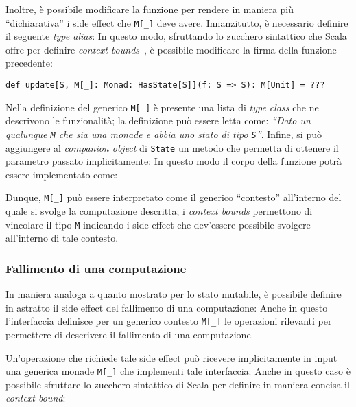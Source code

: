 Inoltre, è possibile modificare la funzione per rendere in maniera più ``dichiarativa'' i side effect che \lstinline{M[_]} deve avere. Innanzitutto, è necessario definire il seguente \emph{type alias}:
In questo modo, sfruttando lo zucchero sintattico che Scala offre per definire \emph{context bounds}~\cite{cit:context-bounds}, è possibile modificare la firma della funzione precedente:
\begin{lstlisting}[language=scala3]
def update[S, M[_]: Monad: HasState[S]](f: S => S): M[Unit] = ???
\end{lstlisting}
Nella definizione del generico \lstinline{M[_]} è presente una lista di \emph{type class} che ne descrivono le funzionalità; la definizione può essere letta come: \emph{``Dato un qualunque \lstinline{M} che sia una monade e abbia uno stato di tipo \lstinline{S}''}.
Infine, si può aggiungere al \emph{companion object} di \lstinline{State} un metodo che permetta di ottenere il parametro passato implicitamente:
In questo modo il corpo della funzione potrà essere implementato come:

Dunque, \lstinline{M[_]} può essere interpretato come il generico ``contesto'' all'interno del quale si svolge la computazione descritta; i \emph{context bounds} permettono di vincolare il tipo \lstinline{M} indicando i side effect che dev'essere possibile svolgere all'interno di tale contesto.

\subsubsection{Fallimento di una computazione}
In maniera analoga a quanto mostrato per lo stato mutabile, è possibile definire in astratto il side effect del fallimento di una computazione:
Anche in questo l'interfaccia definisce per un generico contesto \lstinline{M[_]} le operazioni rilevanti per permettere di descrivere il fallimento di una computazione.

Un'operazione che richiede tale side effect può ricevere implicitamente in input una generica monade \lstinline{M[_]} che implementi tale interfaccia:
Anche in questo caso è possibile sfruttare lo zucchero sintattico di Scala per definire in maniera concisa il \emph{context bound}:

